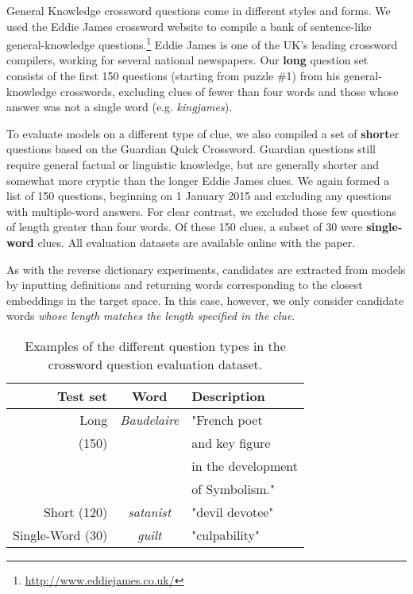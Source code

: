 \documentclass[11pt,letterpaper]{article}
\begin{document}
General Knowledge crossword questions come in different styles and forms. We used the Eddie James crossword website to compile a bank of sentence-like general-knowledge questions.\footnote{\url{http://www.eddiejames.co.uk/}} Eddie James is one of the UK's leading crossword compilers, working for several national newspapers. Our { \bf long} question set consists of the first 150 questions (starting from puzzle \#1) from his general-knowledge crosswords, excluding clues of fewer than four words and those whose answer was not a single word (e.g. \emph{kingjames}).

To evaluate models on a different type of clue, we also compiled a set of {\bf short}er questions based on the Guardian Quick Crossword. Guardian questions still require general factual or linguistic knowledge, but are generally shorter and somewhat more cryptic than the longer Eddie James clues. We again formed a list of 150 questions, beginning on 1 January 2015 and excluding any questions with multiple-word answers. For clear contrast, we excluded those few questions of length greater than four words. Of these 150 clues, a subset of 30 were {\bf single-word} clues. All evaluation datasets are available online with the paper. 

As with the reverse dictionary experiments, candidates are extracted from models by inputting definitions and returning words corresponding to the closest embeddings in the target space. In this case, however, we only consider candidate words \emph{whose length matches the length specified in the clue}.

\begin{table}[ht]
{\small
\emph
\hfill{}
\begin{tabular}{r|cl}
\bf Test set & \bf Word & \bf Description \\
\hline

\hdashline
Long &   \emph{Baudelaire} & "French poet \\ 
 (150) & & and key figure \\ 
&& in the development \\ 
&& of Symbolism." \\
\hdashline 
\rule{0pt}{3ex} 

Short (120) &   \emph{satanist} & "devil devotee" \\

\hdashline
\rule{0pt}{3ex} 
Single-Word (30) &   \emph{guilt} & "culpability" \\
\end{tabular}
\caption{Examples of the different question types in the crossword question evaluation dataset.}
\label{tb:tablename}}
\end{table}
\end{document}
